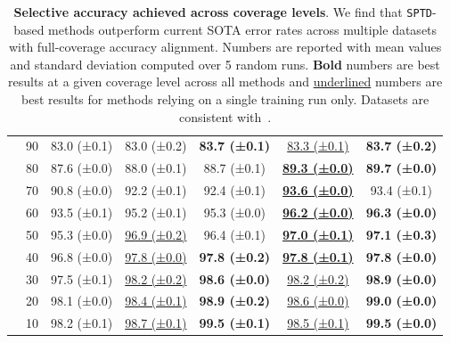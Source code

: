 \begin{table}[h!]
{\begin{tabular}{ccccccc}
     &        90 &  83.0 (±0.1) &  83.0 (±0.2) &  \bfseries 83.7 (±0.1) &  \underline{83.3 (±0.1)} &  \bfseries 83.7 (±0.2) \\
     &        80 &  87.6 (±0.0) &  88.0 (±0.1) &  88.7 (±0.1) &  \underline{\bfseries 89.3 (±0.0)} &  \bfseries 89.7 (±0.0) \\
     &        70 &  90.8 (±0.0) &  92.2 (±0.1) &  92.4 (±0.1) &  \underline{\bfseries 93.6 (±0.0)} &  93.4 (±0.1) \\
     &        60 &  93.5 (±0.1) &  95.2 (±0.1) &  95.3 (±0.0) &  \underline{\bfseries 96.2 (±0.0)} &  \bfseries 96.3 (±0.0) \\
     &        50 &  95.3 (±0.0) &  \underline{96.9 (±0.2)} &  96.4 (±0.1) &  \underline{\bfseries 97.0 (±0.1)} &  \bfseries 97.1 (±0.3) \\
     &        40 &  96.8 (±0.0) &  \underline{97.8 (±0.0)} &  \bfseries 97.8 (±0.2) &  \underline{\bfseries 97.8 (±0.1)} &  \bfseries 97.8 (±0.0) \\
     &        30 &  97.5 (±0.1) &  \underline{98.2 (±0.2)} &  \bfseries 98.6 (±0.0) &  \underline{98.2 (±0.2)} &  \bfseries 98.9 (±0.0) \\
     &        20 &  98.1 (±0.0) &  \underline{98.4 (±0.1)} &  \bfseries 98.9 (±0.2) &  \underline{98.6 (±0.0)} &  \bfseries 99.0 (±0.0) \\
     &        10 &  98.2 (±0.1) &  \underline{98.7 (±0.1)} &  \bfseries 99.5 (±0.1) &  \underline{98.5 (±0.1)} &  \bfseries 99.5 (±0.0) \\
\bottomrule
\end{tabular}
\caption[Selective accuracy achieved across coverage levels]{\textbf{Selective accuracy achieved across coverage levels}. We find that \texttt{SPTD}-based methods outperform current SOTA error rates across multiple datasets with full-coverage accuracy alignment. Numbers are reported with mean values and standard deviation computed over 5 random runs. \textbf{Bold} numbers are best results at a given coverage level across all methods and \underline{underlined} numbers are best results for methods relying on a single training run only. Datasets are consistent with~\cite{feng2023towards}.}
    \label{tab:target_cov}
    }
\end{table} 